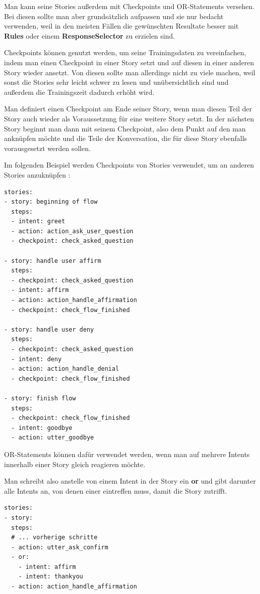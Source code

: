 Man kann seine Stories außerdem mit Checkpoints und OR-Statements versehen.
Bei diesen sollte man aber grundsätzlich aufpassen und sie nur bedacht verwenden, weil in den meisten Fällen die gewünschten Resultate besser mit \textbf{Rules} oder einem \textbf{ResponseSelector} zu erzielen sind.
\cite{checkpointsor}

Checkpoints können genutzt werden, um seine Trainingsdaten zu vereinfachen, indem man einen Checkpoint in einer Story setzt und auf diesen in einer anderen Story wieder ansetzt.
Von diesen sollte man allerdings nicht zu viele machen, weil sonst die Stories sehr leicht schwer zu lesen und unübersichtlich sind und außerdem die Trainingszeit dadurch erhöht wird.
\cite{checkpoints}

Man definiert einen Checkpoint am Ende seiner Story, wenn man diesen Teil der Story auch wieder als Voraussetzung für eine weitere Story setzt.
In der nächsten Story beginnt man dann mit seinem Checkpoint, also dem Punkt auf den man anknüpfen möchte und die Teile der Konversation, die für diese Story ebenfalls vorausgesetzt werden sollen.

Im folgenden Beispiel werden Checkpoints von Stories verwendet, um an anderen Stories anzuknüpfen\cite{checkpoints}
:

\begin{lstlisting}[label={lst: Checkpoints Example}]
stories:
- story: beginning of flow
  steps:
  - intent: greet
  - action: action_ask_user_question
  - checkpoint: check_asked_question

- story: handle user affirm
  steps:
  - checkpoint: check_asked_question
  - intent: affirm
  - action: action_handle_affirmation
  - checkpoint: check_flow_finished

- story: handle user deny
  steps:
  - checkpoint: check_asked_question
  - intent: deny
  - action: action_handle_denial
  - checkpoint: check_flow_finished

- story: finish flow
  steps:
  - checkpoint: check_flow_finished
  - intent: goodbye
  - action: utter_goodbye
\end{lstlisting}

OR-Statements können dafür verwendet werden, wenn man auf mehrere Intents innerhalb einer Story gleich reagieren möchte.\cite{orStatements}

Man schreibt also anstelle von einem Intent in der Story ein \textbf{or} und gibt darunter alle Intents an, von denen einer eintreffen muss, damit die Story zutrifft.

\begin{lstlisting}[label={lst: OR Example}]
stories:
- story:
  steps:
  # ... vorherige schritte
  - action: utter_ask_confirm
  - or:
    - intent: affirm
    - intent: thankyou
  - action: action_handle_affirmation
\end{lstlisting}

